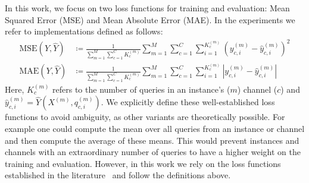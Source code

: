 %    
%    
    

In this work, we focus on two loss functions for training and evaluation: Mean Squared Error (MSE) and Mean Absolute Error (MAE). 
In the experiments we refer to implementations defined as follows:
\begin{align}
    \text{MSE}(Y,\hat{Y}) &\coloneqq \frac{1}{\sum^M_{m=1} \sum^C_{c=1} K_c^{(m)}} \sum^M_{m=1} \sum^C_{c=1} \sum^{K_c^{(m)}}_{i=1} {(y^{(m)}_{c,i} - \hat{y}^{(m)}_{c,i})}^2  \\
    \text{MAE}(Y,\hat{Y}) &\coloneqq \frac{1}{\sum^M_{m=1} \sum^C_{c=1} K_c^{(m)}} \sum^M_{m=1} \sum^C_{c=1} \sum^{K_c^{(m)}}_{i=1} |y^{(m)}_{c,i} - \hat{y}^{(m)}_{c,i}| 
\end{align}
Here, $K_c^{(m)}$ refers to the number of queries in an instance's ($m$) channel ($c$) and $\hat{y}^{(m)}_{c,i} = \hat{Y}(X^{(m)},q^{(m)}_{c,i})$. 
We explicitly define these well-established loss functions to avoid ambiguity, as other variants are theoretically possible.
For example one could compute the mean over all queries from an instance or channel and then compute the average of these means. 
This would prevent instances and channels with an extraordinary number of queries to have a higher weight on the training and evaluation. 
However, in this work we rely on the loss functions established in the literature~\cite{DeBrouwer2019.GRUODEBayes, Bilos2021.Neural,Schirmer2022.Modeling, Yalavarthi2023.Forecasting, Zhang.Irregular} and follow the definitions above. 